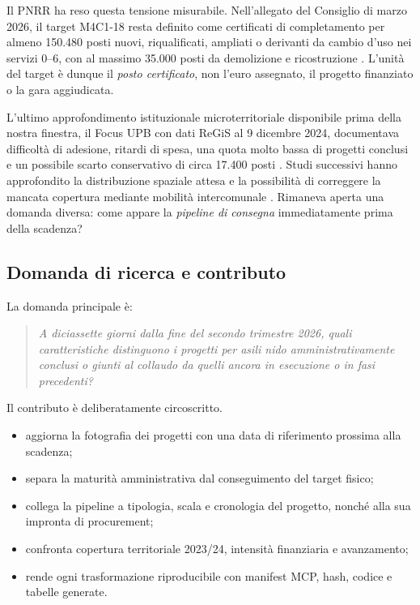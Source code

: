 \documentclass[10pt,a4paper]{article}
\begin{document}
Il PNRR ha reso questa tensione misurabile. Nell\textquoteright{}allegato del Consiglio di marzo 2026, il target M4C1-18 resta definito come certificati di completamento per almeno 150.480 posti nuovi, riqualificati, ampliati o derivanti da cambio d'uso nei servizi 0--6, con al massimo 35.000 posti da demolizione e ricostruzione \citep{ec2026target}. L'unità del target è dunque il \emph{posto certificato}, non l'euro assegnato, il progetto finanziato o la gara aggiudicata.

L'ultimo approfondimento istituzionale microterritoriale disponibile prima della nostra finestra, il Focus UPB con dati ReGiS al 9 dicembre 2024, documentava difficoltà di adesione, ritardi di spesa, una quota molto bassa di progetti conclusi e un possibile scarto conservativo di circa 17.400 posti \citep{upb2025}. Studi successivi hanno approfondito la distribuzione spaziale attesa e la possibilità di correggere la mancata copertura mediante mobilità intercomunale \citep{zanardi2026}. Rimaneva aperta una domanda diversa: come appare la \emph{pipeline di consegna} immediatamente prima della scadenza?

\subsection{Domanda di ricerca e contributo}

La domanda principale è:

\begin{quote}
\emph{A diciassette giorni dalla fine del secondo trimestre 2026, quali caratteristiche distinguono i progetti per asili nido amministrativamente conclusi o giunti al collaudo da quelli ancora in esecuzione o in fasi precedenti?}
\end{quote}

Il contributo è deliberatamente circoscritto.

\begin{itemize}
  \item aggiorna la fotografia dei progetti con una data di riferimento prossima alla scadenza;
  \item separa la maturità amministrativa dal conseguimento del target fisico;
  \item collega la pipeline a tipologia, scala e cronologia del progetto, nonché alla sua impronta di procurement;
  \item confronta copertura territoriale 2023/24, intensità finanziaria e avanzamento;
  \item rende ogni trasformazione riproducibile con manifest MCP, hash, codice e tabelle generate.
\end{itemize}
\end{document}
